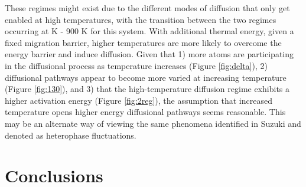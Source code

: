 \documentclass{elsarticle}
\providecommand{\DIFadd}[1]{{\protect\color{blue} \sf #1}} %
\providecommand{\DIFdel}[1]{}
\providecommand{\DIFaddbegin}{} %
\providecommand{\DIFaddend}{} %
\providecommand{\DIFdelbegin}{} %
\providecommand{\DIFdelend}{} %
\begin{document}
These regimes \DIFdelbegin \DIFdel{may be due to }\DIFdelend \DIFaddbegin \DIFadd{might exist due to the }\DIFaddend different modes of diffusion that only get enabled at high temperatures, with the transition between the two \DIFdelbegin \DIFdel{diffusion }\DIFdelend regimes occurring at \DIFdelbegin \DIFdel{800-900 K }\DIFdelend \DIFaddbegin \DIFadd{800 K - 900 K }\DIFaddend for this system. With additional thermal energy, given a fixed migration barrier, higher temperatures are more likely to overcome the energy barrier and induce diffusion. Given that 1) more atoms are participating in the diffusional process as temperature increases (Figure \DIFdelbegin \DIFdel{\ref{fig:atomVsT}}\DIFdelend \DIFaddbegin \DIFadd{\ref{fig:delta}}\DIFaddend ), 2) diffusional pathways appear to become more varied at increasing temperature (Figure \ref{fig:130}), and 3) that the high-temperature diffusion regime exhibits a higher activation energy (Figure \ref{fig:2reg}), the assumption that increased temperature opens higher energy diffusional pathways seems reasonable. This may be an alternate way of viewing the same phenomena identified in Suzuki \cite{suzuki2005} and denoted as heterophase fluctuations. 


\FloatBarrier
\section{Conclusions}
\end{document}
